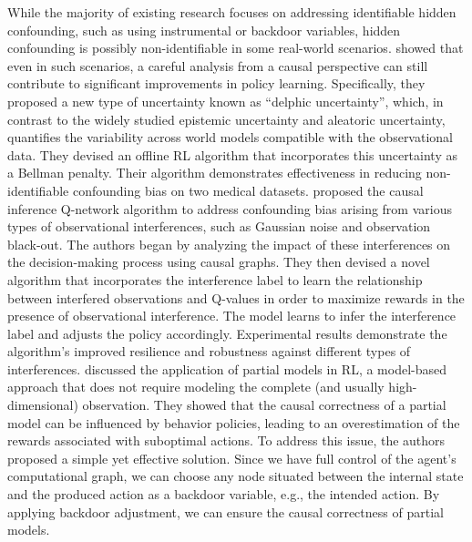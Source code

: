 \documentclass[10pt]{article} %
\theoremstyle{definition}
\begin{document}
While the majority of existing research focuses on addressing identifiable hidden confounding, such as using instrumental or backdoor variables, hidden confounding is possibly non-identifiable in some real-world scenarios. \citet{paceDelphicOfflineReinforcement2023} showed that even in such scenarios, a careful analysis from a causal perspective can still contribute to significant improvements in policy learning. Specifically, they proposed a new type of uncertainty known as ``delphic uncertainty'', which, in contrast to the widely studied epistemic uncertainty and aleatoric uncertainty, quantifies the variability across world models compatible with the observational data. They devised an offline RL algorithm that incorporates this uncertainty as a Bellman penalty. Their algorithm demonstrates effectiveness in reducing non-identifiable confounding bias on two medical datasets.
\citet{yangTrainingResilientQnetwork2022} proposed the causal inference Q-network algorithm to address confounding bias arising from various types of observational interferences, such as Gaussian noise and observation black-out. The authors began by analyzing the impact of these interferences on the decision-making process using causal graphs. They then devised a novel algorithm that incorporates the interference label to learn the relationship between interfered observations and Q-values in order to maximize rewards in the presence of observational interference. The model learns to infer the interference label and adjusts the policy accordingly. Experimental results demonstrate the algorithm's improved resilience and robustness against different types of interferences.
\citet{rezendeCausallyCorrectPartial2020a} discussed the application of partial models in RL, a model-based approach that does not require modeling the complete (and usually high-dimensional) observation. They showed that the causal correctness of a partial model can be influenced by behavior policies, leading to an overestimation of the rewards associated with suboptimal actions. To address this issue, the authors proposed a simple yet effective solution. Since we have full control of the agent's computational graph, we can choose any node situated between the internal state and the produced action as a backdoor variable, e.g., the intended action. By applying backdoor adjustment, we can ensure the causal correctness of partial models. 
\end{document}
